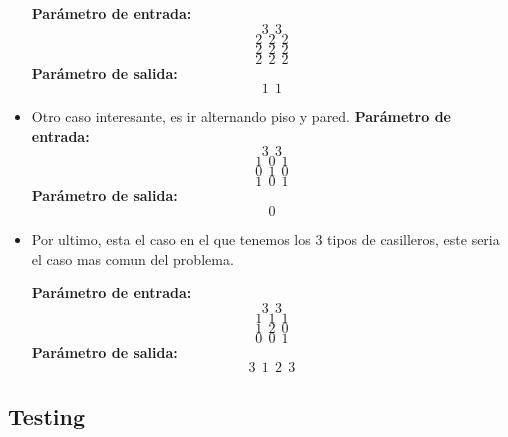 \begin{itemize}
\textbf{Parámetro de entrada:} 
$$3\ \ 3$$
$$2\ \ 2\ \ 2$$
$$2\ \ 2\ \ 2$$
$$2\ \ 2\ \ 2$$
\textbf{Parámetro de salida:} $$ 1\ \ 1 $$\newline

\item Otro caso interesante, es ir alternando piso y pared.
\textbf{Parámetro de entrada:} 
$$3\ \ 3$$
$$1\ \ 0\ \ 1$$
$$0\ \ 1\ \ 0$$
$$1\ \ 0\ \ 1$$
\textbf{Parámetro de salida:} $$ 0 $$\newline


\item Por ultimo, esta el caso en el que tenemos los 3 tipos de casilleros, este seria el caso mas comun del problema. \newline

\textbf{Parámetro de entrada:} 
$$3\ \ 3$$
$$1\ \ 1\ \ 1$$
$$1\ \ 2\ \ 0$$
$$0\ \ 0\ \ 1$$
\textbf{Parámetro de salida:} $$3\ \ 1\ \ 2\ \ 3$$\newline
\end{itemize}

\subsection{Testing}



